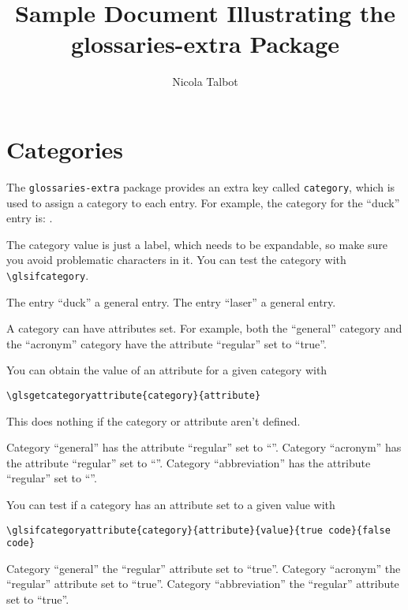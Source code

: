 \documentclass{report}
\title{Sample Document Illustrating the glossaries-extra Package}
\author{Nicola Talbot}
\begin{document}
\maketitle

\tableofcontents

\chapter{Categories}

The \texttt{glossaries-extra} package provides an extra key called
\texttt{category}, which is used to assign a category to each entry.
For example, the category for the ``duck'' entry is:
.

The category value is just a label, which needs to be expandable, so
make sure you avoid problematic characters in it.  You can test the
category with \verb|\glsifcategory|. 

The entry ``duck''  a
general entry.
The entry ``laser''  a
general entry.

A category can have attributes set. For example, both the
``general'' category and the ``acronym'' category have the attribute
``regular'' set to ``true''.

You can obtain the value of an attribute for a given category with
\begin{verbatim}
\glsgetcategoryattribute{category}{attribute}
\end{verbatim}
This does nothing if the category
or attribute aren't defined.

Category ``general'' has the attribute ``regular'' set to 
``''.
Category ``acronym'' has the attribute ``regular'' set to 
``''.
Category ``abbreviation'' has the attribute ``regular'' set to 
``''.

You can test if a category has an attribute set to a given value
with
\begin{verbatim}
\glsifcategoryattribute{category}{attribute}{value}{true code}{false
code}
\end{verbatim}

Category ``general''
the ``regular'' attribute set to ``true''.
Category ``acronym''
the ``regular'' attribute set to ``true''.
Category ``abbreviation''
the ``regular'' attribute set to ``true''.
\end{document}
